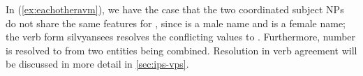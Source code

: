 
\xe

In (\ref{ex:eachotheravm}), we have the case that the two coordinated subject
NPs do not share the same features for \Gend{}, since  is a male
name and  is a female name; the verb form 
{silvyan}{sees} resolves the conflicting values to \M{}. Furthermore, number is
resolved to \Pl{} from two \Sg{} entities being combined. Resolution in verb
agreement will be discussed in more detail in \autoref{sec:ips-vps}.

